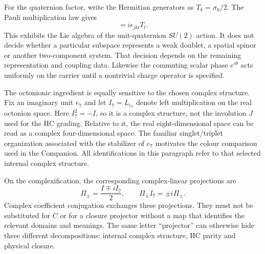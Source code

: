 \documentclass[11pt,a4paper]{article}
\begin{document}
For the quaternion factor, write the Hermitian generators as
$T_k=\sigma_k/2$. The Pauli multiplication law gives
\begin{equation}
 [T_j,T_k]=i\epsilon_{jkl}T_l.
\end{equation}
This exhibits the Lie algebra of the unit-quaternion $SU(2)$ action.
It does not decide whether a particular subspace represents a weak
doublet, a spatial spinor or another two-component system. That
decision depends on the remaining representation and coupling data.
Likewise the commuting scalar phase $e^{i\theta}$ acts uniformly on
the carrier until a nontrivial charge operator is specified.

The octonionic ingredient is equally sensitive to the chosen complex
structure. Fix an imaginary unit $e_7$ and let $I_7=L_{e_7}$ denote
left multiplication on the real octonion space. Here $I_7^2=-I$,
so it is a complex structure, not the involution $J$ used for the HC
grading. Relative to it, the real eight-dimensional space can be
read as a complex four-dimensional space. The familiar singlet/triplet
organization associated with the stabilizer of $e_7$ motivates the
colour comparison used in the Companion. All identifications in this
paragraph refer to that selected internal complex structure.

On the complexification, the corresponding complex-linear projections
are
\begin{equation}
 \Pi_\pm=\frac{I\mp iI_7}{2},\qquad
 \Pi_\pm I_7=\pm i\Pi_\pm.
\end{equation}
Complex coefficient conjugation exchanges these projections. They
must not be substituted for $C$ or for a closure projector without
a map that identifies the relevant domains and meanings. The same
letter ``projector'' can otherwise hide three different decompositions:
internal complex structure, HC parity and physical closure.
\end{document}
